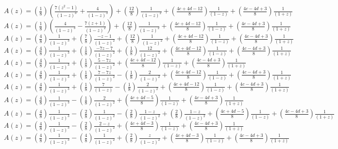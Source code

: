 \documentclass{article}
\begin{document}
\begin{enumerate}[label=\textbf{\alph*.}]
  $A(z) = (\frac{1}{8})(\frac{7(z^2-1)}{(1-z)^3} + \frac{4}{(1-z)^3}) + (\frac{12}{8})\frac{1}{(1-z)^2} + (\frac{4c+4d-12}{8})\frac{1}{(1-z)} + (\frac{4c-4d+3}{8})\frac{1}{(1+z)}$\\
  $A(z) = (\frac{1}{8})(\frac{4}{(1-z)^3} - \frac{7(z+1)}{(1-z)^2}) + (\frac{12}{8})\frac{1}{(1-z)^2} + (\frac{4c+4d-12}{8})\frac{1}{(1-z)} + (\frac{4c-4d+3}{8})\frac{1}{(1+z)}$\\
  $A(z) = (\frac{4}{8})\frac{1}{(1-z)^3} + (\frac{7}{8})\frac{-z-1}{(1-z)^2} + (\frac{12}{8})\frac{1}{(1-z)^2} + (\frac{4c+4d-12}{8})\frac{1}{(1-z)} + (\frac{4c-4d+3}{8})\frac{1}{(1+z)}$\\
  $A(z) = (\frac{4}{8})\frac{1}{(1-z)^3} + (\frac{1}{8})\frac{-7z-7}{(1-z)^2} + (\frac{1}{8})\frac{12}{(1-z)^2} + (\frac{4c+4d-12}{8})\frac{1}{(1-z)} + (\frac{4c-4d+3}{8})\frac{1}{(1+z)}$\\
  $A(z) = (\frac{4}{8})\frac{1}{(1-z)^3} + (\frac{1}{8})\frac{5-7z}{(1-z)^2} + (\frac{4c+4d-12}{8})\frac{1}{(1-z)} + (\frac{4c-4d+3}{8})\frac{1}{(1+z)}$\\
  $A(z) = (\frac{4}{8})\frac{1}{(1-z)^3} + (\frac{1}{8})\frac{7-7z}{(1-z)^2} - (\frac{1}{8})\frac{2}{(1-z)^2} + (\frac{4c+4d-12}{8})\frac{1}{(1-z)} + (\frac{4c-4d+3}{8})\frac{1}{(1+z)}$\\
  $A(z) = (\frac{4}{8})\frac{1}{(1-z)^3} + (\frac{1}{8})\frac{7}{(1-z)} - (\frac{1}{8})\frac{2}{(1-z)^2} + (\frac{4c+4d-12}{8})\frac{1}{(1-z)} + (\frac{4c-4d+3}{8})\frac{1}{(1+z)}$\\
  $A(z) = (\frac{4}{8})\frac{1}{(1-z)^3} - (\frac{1}{8})\frac{2}{(1-z)^2} + (\frac{4c+4d-5}{8})\frac{1}{(1-z)} + (\frac{4c-4d+3}{8})\frac{1}{(1+z)}$\\
  $A(z) = (\frac{4}{8})\frac{1}{(1-z)^3} - (\frac{2}{8})\frac{1}{(1-z)^2} - (\frac{2}{8})\frac{1-z}{(1-z)^2} + (\frac{2}{8})\frac{1-z}{(1-z)^2} + (\frac{4c+4d-5}{8})\frac{1}{(1-z)} + (\frac{4c-4d+3}{8})\frac{1}{(1+z)}$\\
  $A(z) = (\frac{4}{8})\frac{1}{(1-z)^3} - (\frac{2}{8})\frac{2-z}{(1-z)^2} + (\frac{4c+4d-3}{8})\frac{1}{(1-z)} + (\frac{4c-4d+3}{8})\frac{1}{(1+z)}$\\
  $A(z) = (\frac{4}{8})\frac{1}{(1-z)^3} - (\frac{4}{8})\frac{1}{(1-z)^2} + (\frac{2}{8})\frac{z}{(1-z)^2} + (\frac{4c+4d-3}{8})\frac{1}{(1-z)} + (\frac{4c-4d+3}{8})\frac{1}{(1+z)}$\\
  

\end{enumerate}
\end{document}
